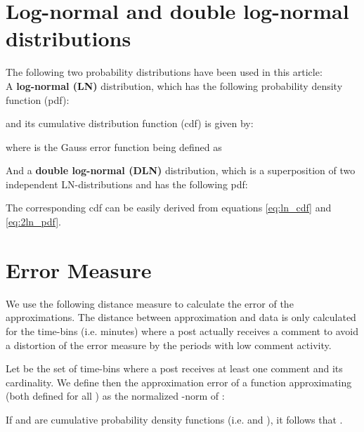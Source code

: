\documentclass[twoside,11pt]{article}
\begin{document}



\begin{appendix}
\section{Log-normal and double log-normal distributions}
\label{sec:densities}\noindent
The following two probability distributions have been used in this article:\\
A \textbf{log-normal (LN)} distribution, which has the following
  probability density function (pdf):

and its cumulative distribution function (cdf) is given by:

where  is the Gauss error function
being defined as

And a \textbf{double log-normal (DLN)} distribution, which is a superposition
  of two independent LN-distributions and has the following pdf:

The corresponding cdf can be easily derived from equations \eqref{eq:ln_cdf} and \eqref{eq:2ln_pdf}.
\section{Error Measure }
\noindent \label{sec:error}\hspace{-1mm} We use the following distance
measure to calculate the error of the approximations. The distance
between approximation and data is only calculated for the time-bins
(i.e.  minutes) where a post actually receives a comment to avoid a
distortion of the error measure by the periods with low comment
activity.
\begin{definition}
  Let  be the set of time-bins where a post receives at
  least one comment and  its cardinality.  We define then the
  approximation error  of a function  approximating
   (both defined for all ) as the normalized
  -norm of :

\end{definition}\noindent
If  and  are cumulative probability density functions
(i.e.  and ), it follows that .  
\end{appendix}

\vskip 0.2in


\end{document}
